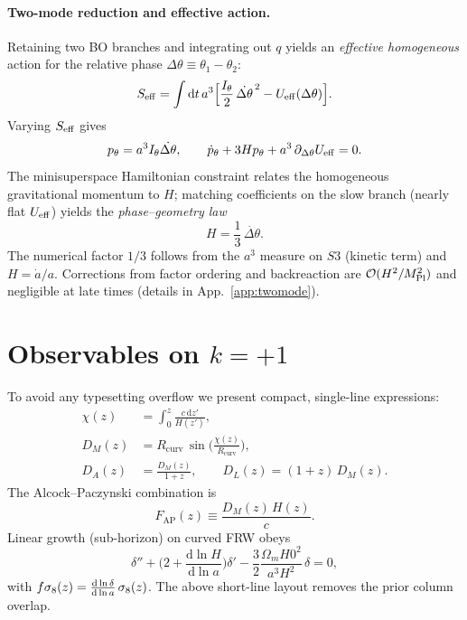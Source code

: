 \documentclass[twocolumn,aps,prd,showpacs,nofootinbib,superscriptaddress]{revtex4-2}
\def\Sthree{S3}%
\def\Hnow{H0}%
\newcommand{\Sthree}{S^{3}}
\newcommand{\Om}{\Omega_m}
\newcommand{\Hnow}{H_0}
\newcommand{\dd}{\mathrm{d}}
\newcommand{\Rcurv}{R_{\mathrm{curv}}}
\newcommand{\ap}{\mathrm{AP}}
\begin{document}
\paragraph*{Two-mode reduction and effective action.}
Retaining two BO branches and integrating out $q$ yields an \emph{effective homogeneous} action for the relative phase $\Delta\theta\equiv\theta_1-\theta_2$:
\begin{equation}
S_{\rm eff}=\int \dd t\, a^3\Big[\frac{I_\theta}{2}\,\dot{\Delta\theta}^{\,2}-U_{\rm eff}(\Delta\theta)\Big].
\end{equation}
Varying $S_{\rm eff}$ gives
\begin{equation}
p_\theta=a^3 I_\theta \dot{\Delta\theta},\qquad
\dot{p}_\theta+3H p_\theta + a^3\,\partial_{\Delta\theta}U_{\rm eff}=0.
\end{equation}
The minisuperspace Hamiltonian constraint relates the homogeneous gravitational momentum to $H$; matching coefficients on the slow branch (nearly flat $U_{\rm eff}$) yields the \emph{phase--geometry law}
\begin{equation}
\label{eq:phase-law}
H=\frac{1}{3}\,\dot{\Delta\theta}.
\end{equation}
The numerical factor $1/3$ follows from the $a^3$ measure on $\Sthree$ (kinetic term) and $H=\dot{a}/a$. Corrections from factor ordering and backreaction are $\mathcal{O}(H^2/M_{\rm Pl}^2)$ and negligible at late times (details in App.~\ref{app:twomode}).

\section{Observables on $k{=}+1$}
\label{sec:obs}
To avoid any typesetting overflow we present compact, single-line expressions:
\begin{align}
\chi(z)&=\int_{0}^{z}\! \frac{c\,\dd z'}{H(z')},\\
D_M(z)&=\Rcurv\,\sin\!\Big(\frac{\chi(z)}{\Rcurv}\Big),\\
D_A(z)&=\frac{D_M(z)}{1+z},\qquad
D_L(z)=(1+z)\,D_M(z).
\end{align}
The Alcock--Paczynski combination is
\begin{equation}
F_{\ap}(z)\equiv \frac{D_M(z)\,H(z)}{c}.
\end{equation}
Linear growth (sub-horizon) on curved FRW obeys
\begin{equation}
\delta''+\Big(2+\frac{\dd\ln H}{\dd\ln a}\Big)\delta' - \frac{3}{2}\frac{\Om \Hnow^2}{a^3 H^2}\,\delta=0,
\end{equation}
with $f\sigma_8(z)=\dv{\ln \delta}{\ln a}\,\sigma_{8}(z)$.
The above short-line layout removes the prior column overlap.
\end{document}
